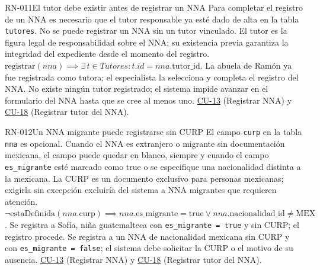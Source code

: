 \begin{BussinesRule}[%
	\brClassification{\btEnabler}{\bcCondition}{\blStrict}%
	]{RN-011}{El tutor debe existir antes de registrar un NNA}
	\BRitem[Descripción:] Para completar el registro de un NNA es necesario que el tutor responsable ya esté dado de alta en la tabla \texttt{tutores}. No se puede registrar un NNA sin un tutor vinculado.
	\BRitem[Motivación:] El tutor es la figura legal de responsabilidad sobre el NNA; su existencia previa garantiza la integridad del expediente desde el momento del registro.
	\BRitem[Sentencia:] $\text{registrar}(nna) \implies \exists \, t \in Tutores : t.id = nna.\text{tutor\_id}$.
	 La abuela de Ramón ya fue registrada como tutora; el especialista la selecciona y completa el registro del NNA.
	 No existe ningún tutor registrado; el sistema impide avanzar en el formulario del NNA hasta que se cree al menos uno.
	 \hyperlink{CU-13}{CU-13} (Registrar NNA) y \hyperlink{CU-18}{CU-18} (Registrar tutor del NNA).
\end{BussinesRule}

\begin{BussinesRule}[%
	\brClassification{\btEnabler}{\bcCondition}{\blStrict}%
	]{RN-012}{Un NNA migrante puede registrarse sin CURP}
	\BRitem[Descripción:] El campo \texttt{curp} en la tabla \texttt{nna} es opcional. Cuando el NNA es extranjero o migrante sin documentación mexicana, el campo puede quedar en blanco, siempre y cuando el campo \texttt{es\_migrante} esté marcado como true o se especifique una nacionalidad distinta a la mexicana.
	\BRitem[Motivación:] La CURP es un documento exclusivo para personas mexicanas; exigirla sin excepción excluiría del sistema a NNA migrantes que requieren atención.
	\BRitem[Sentencia:] $\neg \text{estaDefinida}(nna.\text{curp}) \implies nna.\text{es\_migrante} = \text{true} \lor nna.\text{nacionalidad\_id} \neq \text{MEX}$.
	 Se registra a Sofía, niña guatemalteca con \texttt{es\_migrante = true} y sin CURP; el registro procede.
	 Se registra a un NNA de nacionalidad mexicana sin CURP y con \texttt{es\_migrante = false}; el sistema debe solicitar la CURP o el motivo de su ausencia.
	 \hyperlink{CU-13}{CU-13} (Registrar NNA) y \hyperlink{CU-18}{CU-18} (Registrar tutor del NNA).
\end{BussinesRule}

